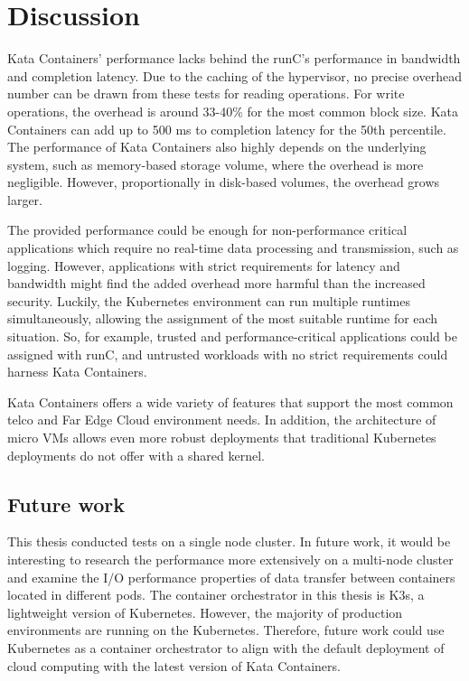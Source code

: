 \chapter{Discussion}
\label{chapter:discussion}

Kata Containers' performance lacks behind the runC's performance in bandwidth and completion latency. Due to the caching of the hypervisor, no precise overhead number can be drawn from these tests for reading operations. For write operations, the overhead is around 33-40\% for the most common block size. Kata Containers can add up to 500 ms to completion latency for the 50th percentile. The performance of Kata Containers also highly depends on the underlying system, such as memory-based storage volume, where the overhead is more negligible. However, proportionally in disk-based volumes, the overhead grows larger.

The provided performance could be enough for non-performance critical applications which require no real-time data processing and transmission, such as logging. However, applications with strict requirements for latency and bandwidth might find the added overhead more harmful than the increased security. Luckily, the Kubernetes environment can run multiple runtimes simultaneously, allowing the assignment of the most suitable runtime for each situation. So, for example, trusted and performance-critical applications could be assigned with runC, and untrusted workloads with no strict requirements could harness Kata Containers.

Kata Containers offers a wide variety of features that support the most common telco and Far Edge Cloud environment needs. In addition, the architecture of micro VMs allows even more robust deployments that traditional Kubernetes deployments do not offer with a shared kernel.

\section{Future work}

This thesis conducted tests on a single node cluster. In future work, it would be interesting to research the performance more extensively on a multi-node cluster and examine the I/O performance properties of data transfer between containers located in different pods. The container orchestrator in this thesis is K3s, a lightweight version of Kubernetes. However, the majority of production environments are running on the Kubernetes. Therefore, future work could use Kubernetes as a container orchestrator to align with the default deployment of cloud computing with the latest version of Kata Containers.

